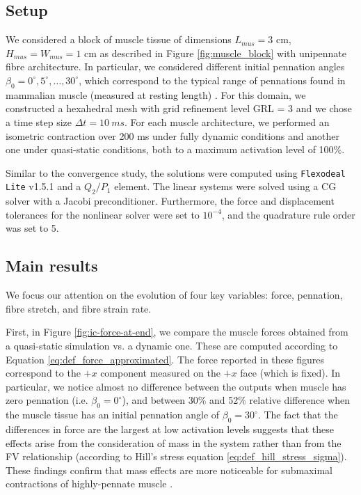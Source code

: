 \documentclass{sfuthesis}
\numberwithin{equation}{section}
\numberwithin{figure}{chapter}
\numberwithin{table}{chapter}
\theoremstyle{definition}
\begin{document}
\subsection{Setup}

We considered a block of muscle tissue of dimensions $L_{mus}=3$ cm, $H_{mus}=W_{mus}=1$ cm as described in Figure \ref{fig:muscle_block} with unipennate fibre architecture. In particular, we considered different initial pennation angles $\beta_0 = 0^\circ, 5^\circ, \dots, 30^\circ$, which correspond to the typical range of pennations found in mammalian muscle (measured at resting length) \cite{LieberFriden2000}. For this domain, we constructed a hexahedral mesh with grid refinement level GRL = 3 and we chose a time step size $\Delta t = 10 \ \si{ms}$. For each muscle architecture, we performed an isometric contraction over 200 ms under fully dynamic conditions and another one under quasi-static conditions, both to a maximum activation level of 100\%.

Similar to the convergence study, the solutions were computed using \texttt{Flexodeal Lite} v1.5.1 and a $Q_2/P_1$ element. The linear systems were solved using a CG solver with a Jacobi preconditioner. Furthermore, the force and displacement tolerances for the nonlinear solver were set to $10^{-4}$, and the quadrature rule order was set to 5.

\subsection{Main results}

We focus our attention on the evolution of four key variables: force, pennation, fibre stretch, and fibre strain rate. 

First, in Figure \ref{fig:ic-force-at-end}, we compare the muscle forces obtained from a quasi-static simulation vs. a dynamic one. These are computed according to Equation \eqref{eq:def_force_approximated}. The force reported in these figures correspond to the $+x$ component measured on the $+x$ face (which is fixed). In particular, we notice almost no difference between the outputs when muscle has zero pennation (i.e. $\beta_0 = 0^\circ$), and between 30\% and 52\% relative difference when the muscle tissue has an initial pennation angle of $\beta_0 = 30^\circ$. The fact that the differences in force are the largest at low activation levels suggests that these effects arise from the consideration of mass in the system rather than from the FV relationship (according to Hill's stress equation \eqref{eq:def_hill_stress_sigma}). These findings confirm that mass effects are more noticeable for submaximal contractions of highly-pennate muscle \cite{Paper1_WakelingEtAl2020}.
\end{document}
